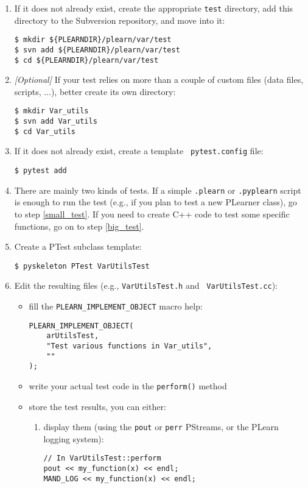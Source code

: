 \documentclass[11pt]{book}
\begin{document}
\begin{enumerate}
  \item If it does not already exist, create the appropriate {\tt test}
  directory, add this directory to the Subversion repository, and move
  into it:
\begin{verbatim}
$ mkdir ${PLEARNDIR}/plearn/var/test
$ svn add ${PLEARNDIR}/plearn/var/test
$ cd ${PLEARNDIR}/plearn/var/test
\end{verbatim}

  \item {\em [Optional]} If your test relies on more than a couple
  of custom files (data files, scripts, ...), better create its own
  directory:
\begin{verbatim}
$ mkdir Var_utils
$ svn add Var_utils
$ cd Var_utils
\end{verbatim}

  \item If it does not already exist, create a template {\tt
  pytest.config} file:
\begin{verbatim}
$ pytest add
\end{verbatim}

  \item There are mainly two kinds of tests. If a simple {\tt .plearn}
  or {\tt .pyplearn} script is enough to run the test (e.g., if you plan
  to test a new PLearner class), go to step \ref{small_test}. If you need to create
  C++ code to test some specific functions, go on to step \ref{big_test}.

  \item \label{big_test} Create a PTest subclass template:
\begin{verbatim}
$ pyskeleton PTest VarUtilsTest
\end{verbatim}

  \item Edit the resulting files (e.g., {\tt VarUtilsTest.h} and {\tt
VarUtilsTest.cc}):
  \begin{itemize}
    \item fill the {\tt PLEARN\_IMPLEMENT\_OBJECT} macro help:
\begin{verbatim}
PLEARN_IMPLEMENT_OBJECT(
    arUtilsTest,
    "Test various functions in Var_utils",
    ""
);
\end{verbatim}

    \item write your actual test code in the {\tt perform()} method
    \item store the test results, you can either:
    \begin{enumerate}
      \item display them (using the {\tt pout} or {\tt perr} PStreams,
      or the PLearn logging system):
\begin{verbatim}
// In VarUtilsTest::perform
pout << my_function(x) << endl;
MAND_LOG << my_function(x) << endl;
\end{verbatim}


\end{enumerate}
\end{itemize}
\end{enumerate}
\end{document}
